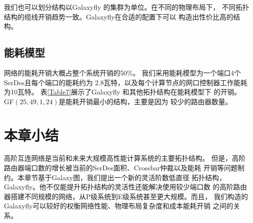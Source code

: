 我们也可以划分结构以Galaxyfly 的集群为单位。在不同的物理布局下，
不同拓扑结构的缆线开销趋势一致。Galaxyfly在合适的配置下可以
构造出性价比高的结构。

\subsection{能耗模型}

网络的能耗开销大概占整个系统开销的50\%。
我们采用能耗模型为一个端口4个SerDes且每个端口的能耗约为
2.8瓦特，以及每个计算节点的网口控制器工作能耗为10瓦特。
表\ref{Table7}展示了Galaxyfly 和其他拓扑结构在能耗模型下
的开销。GF$(25,49,1,24)$是能耗开销最小的结构，主要是因为
较少的路由器数量。

\section{本章小结}

高阶互连网络是当前和未来大规模高性能计算系统的主要拓扑结构。
但是，高阶路由器端口数的增长被当前的SerDes面积、Crossbar仲裁以及能耗
开销等问题制约。本章节基于Galaxy图，我们提出一个新的灵活阶数低直径
拓扑结构，Galaxyfly。他不仅能提升拓扑结构的灵活性还能解决使用较少端口数
的高阶路由器搭建不同规模的网络，从P级系统到E级系统甚至更大规模。而且，
我们构造的Galaxyfly可以较好的权衡网络性能、物理布局复杂度和成本能耗开销
之间的关系。

